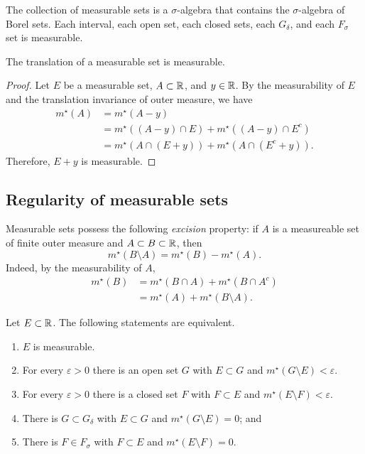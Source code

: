 \begin{theorem}[]
	The collection of measurable sets is a $\sigma$-algebra that contains
	the $\sigma$-algebra of Borel sets.
	Each interval, each open set, each closed sets, each $G_\delta$, and each
	$F_\sigma$ set is measurable.
\end{theorem}

\begin{proposition}[]
	The translation of a measurable set is measurable.
\end{proposition}

\begin{proof}
	Let $E$ be a measurable set,
	$A \subset \mathbb{R}$, and $y \in \mathbb{R}$.
	By the measurability of $E$ and the translation invariance of outer
	measure, we have
	\begin{align*}
		m^\star(A)
		&= m^\star(A - y) \\
		&= m^\star((A - y) \cap E)
			+ m^\star((A - y) \cap E^c) \\
		&= m^\star(A \cap (E + y)) + m^\star(A \cap (E^c + y)).
	\end{align*}
	Therefore, $E + y$ is measurable.
\end{proof}

\subsection{Regularity of measurable sets}

Measurable sets possess the following \emph{excision} property:
if $A$ is a measureable set of finite outer measure and 
$A \subset B \subset \mathbb{R}$, then
\[
	m^\star\left( 
		B \setminus A 
	\right) = m^\star(B) - m^\star(A).
\]
Indeed, by the measurability of $A$,
\begin{align*}
	m^\star(B) 
	&= m^\star(B \cap A) + m^\star(B \cap A^c) \\
	&= m^\star(A) + m^\star(B \setminus A).
\end{align*}

\begin{proposition}[]
	Let $E \subset \mathbb{R}$.
	The following statements are equivalent.
	\begin{enumerate}
		\item $E$ is measurable.
		\item For every $\varepsilon > 0$ there is an open set $G$ with
			$E \subset G$ and $m^\star(G \setminus E) < \varepsilon$.
		\item For every $\varepsilon > 0$ there is a closed set $F$ with
			$F \subset E$ and $m^\star(E \setminus F) < \varepsilon$.
		\item There is $G \subset G_\delta$ with $E \subset G$ and
			$m^\star(G \setminus E) = 0$; and
		\item There is $F \in F_\sigma$ with $F \subset E$ and
			$m^\star(E \setminus F) = 0$.
	\end{enumerate}
\end{proposition}

